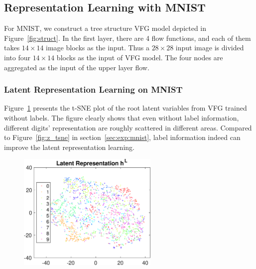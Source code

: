 \documentclass{article}
\begin{document}
\subsection{Representation Learning with MNIST}
For MNIST, we construct a tree structure VFG model depicted in Figure~\ref{fig:struct}.  
In the first layer, there are 4 flow functions, and each of them takes $14\times 14$ image blocks as the input. 
Thus a $28\times 28$ input image is divided into four $14\times 14$ blocks as the input of VFG model. 
The four nodes are aggregated as the input of the upper layer flow. 


\subsubsection{Latent Representation Learning on MNIST}
Figure~\ref{fig:z_no_Y} presents the t-SNE plot of the root latent variables from VFG trained without labels. The figure clearly shows that even without label information, different digits' representation are roughly scattered in different areas.  Compared to Figure~\ref{fig:z_tsne} in section~\ref{sec:exp:mnist}, label information indeed can improve the latent representation learning. 
\begin{figure}[H]
    \centering
       \includegraphics[width=0.6\textwidth]{fig/z_no_Y_2.eps} 
    \label{fig:z_no_Y}
\end{figure}
 
\end{document}
